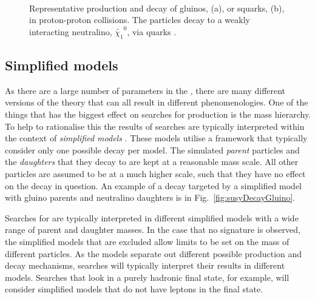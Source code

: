 \begin{figure}
  \centering
  ~~~ 
  \caption{Representative \SUSY production and decay of gluinos, (a), or
  squarks, (b), in proton-proton collisions. The \SUSY particles decay
  to a weakly interacting neutralino, $\tilde{\chi_1}^0$, via \SM
  quarks \cite{smsTwiki}.}
  \label{fig:susyDecay}
\end{figure}

\subsection{Simplified models}
\label{sec:simplifiedModels}

As there are a large number of parameters in the \MSSM, there are many
different versions of the theory that can all result in different
phenomenologies. One of the things that has the biggest effect
on searches for \SUSY production is the mass hierarchy.
To help to rationalise this the results of
\SUSY searches are typically interpreted within the context of
\emph{simplified models} \cite{Alwall:2008ag,Alves:2011wf}. These
models utilise a \SMS framework that typically consider only one
possible \SUSY decay per model. The simulated \emph{parent} \SUSY
particles and the \emph{daughters} that they decay to are kept at a
reasonable mass scale. All other \SUSY
particles are assumed to be at a much higher scale, such that they
have no effect on the decay in question. An example of a decay
targeted by a simplified model with gluino parents and neutralino
daughters is in Fig.~\ref{fig:susyDecayGluino}. 

Searches for \SUSY are typically interpreted in different simplified
models with a wide range of parent and daughter masses. In the case
that no \SUSY signature is observed, the simplified models that are
excluded allow limits to be set on the mass of different \SUSY
particles. As the models separate out different possible \SUSY
production and decay mechanisms, searches will typically interpret
their results in different models. Searches that look in a purely
hadronic final state, for example, will consider simplified models
that do not have leptons in the final state. 

